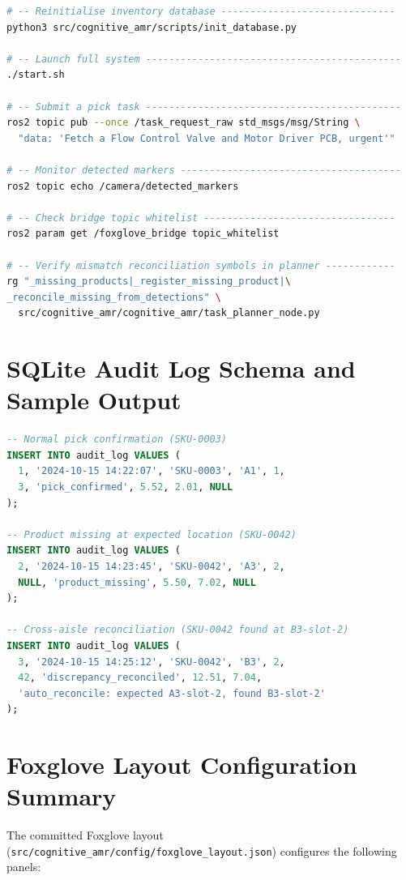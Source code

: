 \documentclass[12pt,a4paper]{report}
\begin{document}
\begin{appendices}
\begin{lstlisting}[language=bash, caption={Standard build and validation workflow.}]
# -- Reinitialise inventory database ------------------------------
python3 src/cognitive_amr/scripts/init_database.py

# -- Launch full system --------------------------------------------
./start.sh

# -- Submit a pick task --------------------------------------------
ros2 topic pub --once /task_request_raw std_msgs/msg/String \
  "data: 'Fetch a Flow Control Valve and Motor Driver PCB, urgent'"

# -- Monitor detected markers --------------------------------------
ros2 topic echo /camera/detected_markers

# -- Check bridge topic whitelist ---------------------------------
ros2 param get /foxglove_bridge topic_whitelist

# -- Verify mismatch reconciliation symbols in planner ------------
rg "_missing_products|_register_missing_product|\
_reconcile_missing_from_detections" \
  src/cognitive_amr/cognitive_amr/task_planner_node.py
\end{lstlisting}

\chapter{SQLite Audit Log Schema and Sample Output}
\label{app:audit}

\begin{lstlisting}[language=SQL, caption={Sample audit log entries for a cross-aisle mismatch scenario.}]
-- Normal pick confirmation (SKU-0003)
INSERT INTO audit_log VALUES (
  1, '2024-10-15 14:22:07', 'SKU-0003', 'A1', 1,
  3, 'pick_confirmed', 5.52, 2.01, NULL
);

-- Product missing at expected location (SKU-0042)
INSERT INTO audit_log VALUES (
  2, '2024-10-15 14:23:45', 'SKU-0042', 'A3', 2,
  NULL, 'product_missing', 5.50, 7.02, NULL
);

-- Cross-aisle reconciliation (SKU-0042 found at B3-slot-2)
INSERT INTO audit_log VALUES (
  3, '2024-10-15 14:25:12', 'SKU-0042', 'B3', 2,
  42, 'discrepancy_reconciled', 12.51, 7.04,
  'auto_reconcile: expected A3-slot-2, found B3-slot-2'
);
\end{lstlisting}

\chapter{Foxglove Layout Configuration Summary}
\label{app:foxglove}

The committed Foxglove layout (\texttt{src/cognitive\_amr/config/foxglove\_layout.json}) configures the following panels:


\end{appendices}
\end{document}
